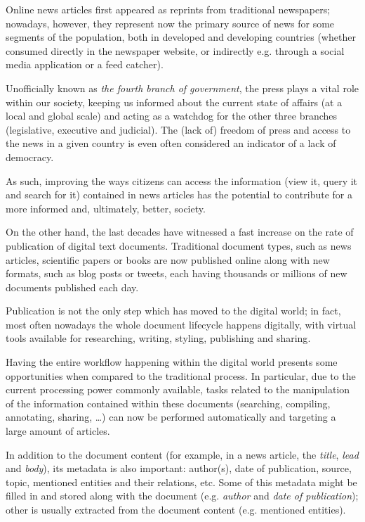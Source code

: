 \documentclass[runningheads,a4paper]{llncs}[2015/06/24]
\begin{document}
Online news articles first appeared as reprints from traditional
newspapers; nowadays, however, they represent now the primary source
of news for some segments of the population, both in developed and
developing countries (whether consumed directly in the newspaper
website, or indirectly e.g. through a social media application or a
feed catcher)\cite{greer2006evolution,boczkowski2005digitizing,chyi1999access}.

Unofficially known as \emph{the fourth branch of government}, the press
plays a vital role within our society, keeping us informed about
the current state of affairs (at a local and global scale) and acting
as a watchdog for the other three branches (legislative, executive and
judicial). The (lack of) freedom of press and access to the news in a
given country is even often considered an indicator of a lack of
democracy\cite{goode2009social,house2009freedom}.

As such, improving the ways citizens can access the information (view
it, query it and search for it) contained in news articles has the
potential to contribute for a more informed and, ultimately, better,
society\cite{bollinger1988tolerant}.

On the other hand, the last decades have witnessed a fast increase on
the rate of publication of digital text documents. Traditional
document types, such as news articles, scientific papers or books are
now published online along with new formats, such as blog posts or
tweets, each having thousands or millions of new documents published
each day\cite{hilbert2011world,allan2006online}.

Publication is not the only step which has moved to the digital world;
in fact, most often nowadays the whole document lifecycle happens
digitally, with virtual tools available for
researching, writing, styling, publishing and sharing\cite{williams2009personal}.

Having the entire workflow happening within the digital world presents
some opportunities when compared to the traditional
process\cite{o1997comparison}. In particular, due to the current
processing power commonly available, tasks related to the manipulation
of the information contained within these documents (searching,
compiling, annotating, sharing, \dots) can now be performed
automatically and targeting a large amount of articles.

In addition to the document content (for example, in a news article,
the \emph{title}, \emph{lead} and \emph{body}), its metadata is also
important: author(s), date of publication, source, topic, mentioned
entities and their relations, etc\cite{yaginuma2003metadata,yaginuma2003design}. Some of
this metadata might be filled in and stored along with the document
(e.g. \emph{author} and \emph{date of publication}); other is usually
extracted from the document content (e.g. mentioned
entities)\cite{vadrevu2005automated}.
\end{document}
